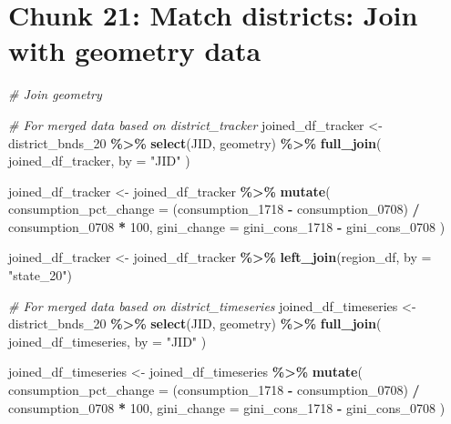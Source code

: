 \documentclass[
]{article}
\newenvironment{Shaded}{\begin{snugshade}}{\end{snugshade}}
\newcommand{\AttributeTok}[1]{\textcolor[rgb]{0.13,0.29,0.53}{#1}}
\newcommand{\CommentTok}[1]{\textcolor[rgb]{0.56,0.35,0.01}{\textit{#1}}}
\newcommand{\DecValTok}[1]{\textcolor[rgb]{0.00,0.00,0.81}{#1}}
\newcommand{\FunctionTok}[1]{\textcolor[rgb]{0.13,0.29,0.53}{\textbf{#1}}}
\newcommand{\NormalTok}[1]{#1}
\newcommand{\OtherTok}[1]{\textcolor[rgb]{0.56,0.35,0.01}{#1}}
\newcommand{\SpecialCharTok}[1]{\textcolor[rgb]{0.81,0.36,0.00}{\textbf{#1}}}
\newcommand{\StringTok}[1]{\textcolor[rgb]{0.31,0.60,0.02}{#1}}
\begin{document}
\section*{Chunk 21: Match districts: Join with geometry data}\label{chunk-21-match-districts-join-with-geometry-data}

\begin{Shaded}
\begin{Highlighting}[]
\CommentTok{\# Join geometry}

\CommentTok{\# For merged data based on district\_tracker }
\NormalTok{joined\_df\_tracker }\OtherTok{\textless{}{-}}\NormalTok{ district\_bnds\_20 }\SpecialCharTok{\%\textgreater{}\%}
  \FunctionTok{select}\NormalTok{(JID, geometry) }\SpecialCharTok{\%\textgreater{}\%}
  \FunctionTok{full\_join}\NormalTok{(}
\NormalTok{    joined\_df\_tracker,}
    \AttributeTok{by =} \StringTok{"JID"}
\NormalTok{  )}

\NormalTok{joined\_df\_tracker }\OtherTok{\textless{}{-}}\NormalTok{ joined\_df\_tracker }\SpecialCharTok{\%\textgreater{}\%}
  \FunctionTok{mutate}\NormalTok{(}
    \AttributeTok{consumption\_pct\_change =}\NormalTok{ (consumption\_1718 }\SpecialCharTok{{-}}\NormalTok{ consumption\_0708) }\SpecialCharTok{/}\NormalTok{ consumption\_0708 }\SpecialCharTok{*} \DecValTok{100}\NormalTok{,}
    \AttributeTok{gini\_change =}\NormalTok{ gini\_cons\_1718 }\SpecialCharTok{{-}}\NormalTok{ gini\_cons\_0708}
\NormalTok{  )}

\NormalTok{joined\_df\_tracker }\OtherTok{\textless{}{-}}\NormalTok{ joined\_df\_tracker }\SpecialCharTok{\%\textgreater{}\%}
  \FunctionTok{left\_join}\NormalTok{(region\_df, }\AttributeTok{by =} \StringTok{"state\_20"}\NormalTok{)}


\CommentTok{\# For merged data based on district\_timeseries}
\NormalTok{joined\_df\_timeseries }\OtherTok{\textless{}{-}}\NormalTok{ district\_bnds\_20 }\SpecialCharTok{\%\textgreater{}\%}
  \FunctionTok{select}\NormalTok{(JID, geometry) }\SpecialCharTok{\%\textgreater{}\%}
  \FunctionTok{full\_join}\NormalTok{(}
\NormalTok{    joined\_df\_timeseries,}
    \AttributeTok{by =} \StringTok{"JID"}
\NormalTok{  )}

\NormalTok{joined\_df\_timeseries }\OtherTok{\textless{}{-}}\NormalTok{ joined\_df\_timeseries }\SpecialCharTok{\%\textgreater{}\%}
  \FunctionTok{mutate}\NormalTok{(}
    \AttributeTok{consumption\_pct\_change =}\NormalTok{ (consumption\_1718 }\SpecialCharTok{{-}}\NormalTok{ consumption\_0708) }\SpecialCharTok{/}\NormalTok{ consumption\_0708 }\SpecialCharTok{*} \DecValTok{100}\NormalTok{,}
    \AttributeTok{gini\_change =}\NormalTok{ gini\_cons\_1718 }\SpecialCharTok{{-}}\NormalTok{ gini\_cons\_0708}
\NormalTok{  )}


\end{Highlighting}
\end{Shaded}
\end{document}
